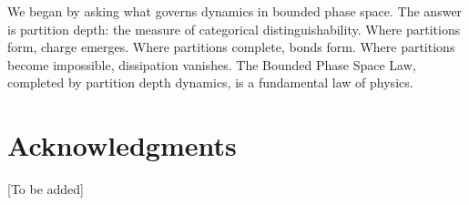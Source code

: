 \documentclass[twocolumn,10pt,a4paper]{article}
\theoremstyle{definition}
\theoremstyle{remark}
\begin{document}
We began by asking what governs dynamics in bounded phase space. The answer is partition depth: the measure of categorical distinguishability. Where partitions form, charge emerges. Where partitions complete, bonds form. Where partitions become impossible, dissipation vanishes. The Bounded Phase Space Law, completed by partition depth dynamics, is a fundamental law of physics.

\section*{Acknowledgments}

[To be added]




\end{document}
